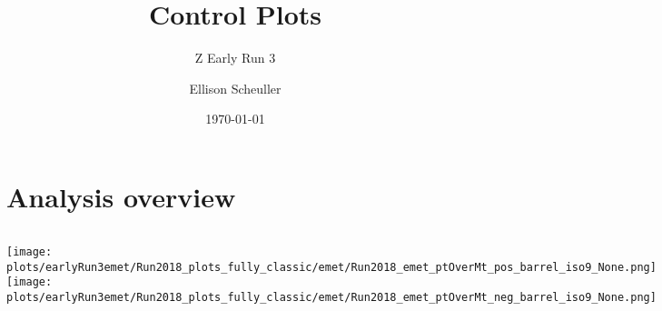\documentclass[en,16:9,navbarinfooter]{presentation/sdqbeamer}
\title{Control Plots}
\subtitle{Z Early Run 3}
\author[Ellison Scheuller]{Ellison Scheuller}
\date[\today]{\today}
\begin{document}
\KITtitleframe


\section{Analysis overview}


%
%	
%
\begin{frame}{\insertsubsection}
   \begin{columns}
   \texttt{[image: plots/earlyRun3emet/Run2018\_plots\_fully\_classic/emet/Run2018\_emet\_ptOverMt\_pos\_barrel\_iso9\_None.png]}
   \texttt{[image: plots/earlyRun3emet/Run2018\_plots\_fully\_classic/emet/Run2018\_emet\_ptOverMt\_neg\_barrel\_iso9\_None.png]}
\end{columns}
\end{frame}
\end{document}
